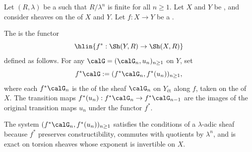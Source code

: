 \begin{definition} \label{definition:inverse_image_functor_on_lambda_adic_sheaves_with_integral_coefficients_on_a_noetherian_scheme}
Let $(R, \lambda)$ be a   such that $R/\lambda^n$ is finite for all $n \geq 1$. Let $X$ and $Y$ be , and consider sheaves on the  of $X$ and $Y$. Let $f: X \to Y$ be a .

The  is the functor
$$\hlin{f^* : \Sh(Y, R) \to \Sh(X, R)}$$
defined as follows. For any  $\calG = (\calG_n, u_n)_{n \geq 1}$ on $Y$, set
$$f^* \calG := (f^* \calG_n, f^*(u_n))_{n \geq 1},$$
where each $f^* \calG_n$ is the  of the sheaf $\calG_n$ on $Y_{\text{\'et}}$ along $f$, taken on the  of $X$. The transition maps $f^*(u_n): f^* \calG_n \to f^* \calG_{n-1}$ are the images of the original transition maps $u_n$ under the functor $f^*$.

The system $(f^* \calG_n, f^*(u_n))_{n \geq 1}$ satisfies the conditions of a $\lambda$-adic sheaf because $f^*$ preserves constructibility, commutes with quotients by $\lambda^n$, and is exact on torsion sheaves whose exponent is invertible on $X$.
\end{definition}
